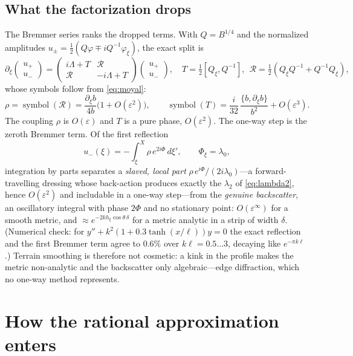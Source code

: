 \documentclass[11pt]{article}
\newcommand{\pd}{\partial}
\begin{document}
\subsection{What the factorization drops}\label{sec:backscatter}
The Bremmer series \cite{bremmer,atkinson,dehoop} ranks the dropped terms.
With $Q=B^{1/4}$ and the normalized amplitudes
$u_\pm=\tfrac12(Q\varphi\mp iQ^{-1}\varphi_\xi)$, the exact split is
\[
\pd_\xi\begin{pmatrix}u_+\\u_-\end{pmatrix}
=\begin{pmatrix}i\Lambda+T & \mathcal R\\ \mathcal R & -i\Lambda+T\end{pmatrix}
\begin{pmatrix}u_+\\u_-\end{pmatrix},\quad
T=\tfrac12[Q_\xi,Q^{-1}],\ \ \mathcal R=\tfrac12(Q_\xi Q^{-1}+Q^{-1}Q_\xi),
\]
whose symbols follow from \eqref{eq:moyal}:
\[
\rho=\operatorname{symbol}(\mathcal R)=\frac{\pd_\xi b}{4b}
\bigl(1+O(\varepsilon^2)\bigr),\qquad
\operatorname{symbol}(T)=\frac i{32}\,\frac{\{b,\pd_\xi b\}}{b^2}
+O(\varepsilon^3).
\]
The coupling $\rho$ is $O(\varepsilon)$ and $T$ is a pure phase, $O(\varepsilon^2)$.
The one-way step is the zeroth Bremmer term. Of the first reflection
\[
u_-(\xi)=-\int_\xi^X\rho\,e^{2i\Phi}\,d\xi',\qquad \Phi_\xi=\lambda_0 ,
\]
integration by parts separates a \emph{slaved, local part}
$\rho\,e^{i\Phi}/(2i\lambda_0)$---a forward-travelling dressing whose
back-action produces exactly the $\lambda_2$ of \eqref{eq:lambda2}, hence
$O(\varepsilon^2)$ and includable in a one-way step---from the
\emph{genuine backscatter}, an oscillatory integral with phase $2\Phi$ and no
stationary point: $O(\varepsilon^\infty)$ for a smooth metric, and
$\approx e^{-2kh_\xi\cos\theta\,\delta}$ for a metric analytic in a strip of
width $\delta$. (Numerical check: for $y''+k^2(1+0.3\tanh(x/\ell))y=0$ the
exact reflection and the first Bremmer term agree to $0.6\%$ over
$k\ell=0.5\dots3$, decaying like $e^{-\pi k\ell}$.) Terrain smoothing is
therefore not cosmetic: a kink in the profile makes the metric non-analytic
and the backscatter only algebraic---edge diffraction, which no one-way method
represents.

\section{How the rational approximation enters}\label{sec:rational}
\end{document}
